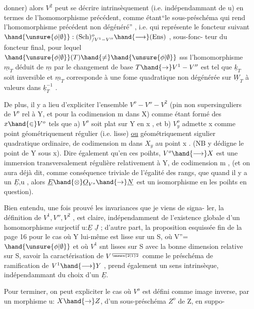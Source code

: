donner) alors $V^2$ peut se décrire intrinsèquement (i.e. indépendammant de u)
 en termes de l'homomorphisme précédent, comme étant``le sous-préschéma
qui rend l'homomorphisme précédent non dégénéré'' , i.e. qui représente le
foncteur suivant $\hand{\unsure{\phi|\emptyset}} : (\mathrm{Sch})^{o}_{/V^1 - V''} \hand{\longrightarrow} (\mathrm{Ens})$ , sous-fonc-%
teur du foncteur final, pour lequel $\hand{\unsure{\phi|\emptyset}}(T)\hand{\neq} \hand{\unsure{\phi|\emptyset}}$ sss l'homomorphisme $\underline{m}_T$ déduit
de $\underline{m}$ par le changement de base $T \hand{\to} V^1 - V''$ est tel que $\underline{k}_T$ soit inversible et
$\underline{m}_T$ corresponde à une fome quadratique non dégénérée sur $\underline{W}_T$ à valeurs dans
$\underline{k}_T^{-1}$ .

De plus, il y a lieu  d'expliciter l'ensemble $V^o - V'' - V^2$ 
(pin non supersinguliers de $V^o$ rel à Y, et pour la codimension m dans X)
comme étant formé des $x \hand{\in} V^o$ tels que a) $V^o$ soit plat sur Y en x , et
b) $V^o_y$ admette x comme point géométriquement régulier (i.e. lisse) \uline{ou}
géométriquement sigulier quadratique ordinaire, de codimension m dans $X_y$
au point x . (NB y dédigne le point de Y sous x). Dire également qu'en ces
poihts, $V^o \hand{\longrightarrow} X$ est une immersion transversalement régulière relativement à
Y, de codimension m , (et on aura déjà dit, comme conséquence triviale de
l'égalité des rangs, que quand il y a un $\underline{E}$,u , alors $\underline{E}\hand{\otimes}\underline{O}_{V^o} \hand{\to} \underline{N}$ est un
isomorphisme en les poihts en question).

Bien entendu, une fois prouvé les invariances que je viens de signa-%
ler, la définition de $V^1, V'', V^2$ ,  est claire, indépendamment
de l'existence globale d'un homomorphisme surjectif u:$\underline{E}$ \quad $\underline{J}$ ; d'autre part,
la proposition esquissée fin de la page 16 pour le cas où Y lui-même est
lisse sur un S, où V''= $\hand{\unsure{\phi|\emptyset}}$ et où \hand{,} $V^1$ snt lisses sur S avec la bonne dimension
relative sur S,  savoir la caractérisation de $V^{\over{\unsure{2|1}}{2}}$ comme le
préschéma de ramification de $V^1 \hand{\longrightarrow} Y$ , prend également un sens intrinsèque,
indépendammant du choix d'un $\underline{E}$.

Pour terminer, on peut expliciter le cas où $V^o$ est défini comme image
inverse, par un morphisme u: $X \hand{\to} Z$, d'un sous-préschéma $Z^o$ de Z, en suppo-%
